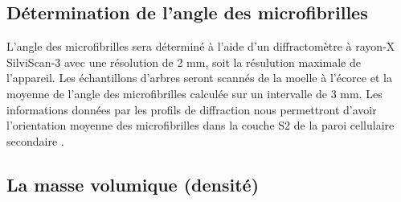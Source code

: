 \documentclass{report}
\begin{document}
\subsection*{Détermination de l'angle des microfibrilles}
L'angle des microfibrilles sera déterminé à l'aide d'un diffractomètre à rayon-X SilviScan-3 avec une résolution de 2 mm, soit la résulution maximale de l'appareil. Les échantillons d'arbres seront scannés de la moelle à l'écorce et la moyenne de l'angle des microfibrilles calculée sur un intervalle de 3 mm. %
Les informations données par les profils de diffraction nous permettront d'avoir l'orientation moyenne des microfibrilles dans la couche S2 de la paroi cellulaire secondaire \citep{Evans1999}.

\subsection*{La masse volumique (densité)}
\end{document}
